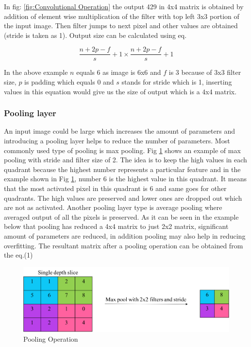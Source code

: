 \documentclass[11pt]{article}
\begin{document}
In fig: \ref{fig:Convolutional Operation} the output 429 in 4x4 matrix is obtained by addition of element wise multiplication of the filter with top left 3x3 portion of the input image. Then filter jumps to next pixel and other values are obtained (stride is taken as 1). Output size can be calculated using eq.

\begin{equation}
\frac{n+2p-f}{s}+1 \times \frac{n+2p-f}{s}+1
\end{equation}

In the above example $n$ equals 6 as image is 6x6 and $f$ is 3 because of 3x3 filter size, $p$ is padding which equals 0 and $s$ stands for stride which is 1, inserting values in this equation would give us the size of output which is a 4x4 matrix.

\subsubsection{Pooling layer}
An input image could be large which increases the amount of parameters and introducing a pooling layer helps to reduce the number of parameters. Most commonly used type of pooling is max pooling. Fig \ref{fig:Pooling Operation} shows an example of max pooling with stride and filter size of 2. The idea is to keep the high values in each quadrant because the highest number represents a particular feature and in the example shown in Fig \ref{fig:Pooling Operation}, number 6 is the highest value in this quadrant. It means that the most activated pixel in this quadrant is 6 and same goes for other quadrants. The high values are preserved and lower ones are dropped out which are not as activated. Another pooling layer type is average pooling where averaged output of all the pixels is preserved. As it can be seen in the example below that pooling has reduced a 4x4 matrix to just 2x2 matrix, significant amount of parameters are reduced, in addition pooling may also help in reducing overfitting. The resultant matrix after a pooling operation can be obtained from the eq.(1) 

\begin{figure}[H]
	\includegraphics[width=\linewidth]{files/cnn_architecture/pooling.png}
	\caption{Pooling Operation}
	\label{fig:Pooling Operation}
\end{figure}
\end{document}
